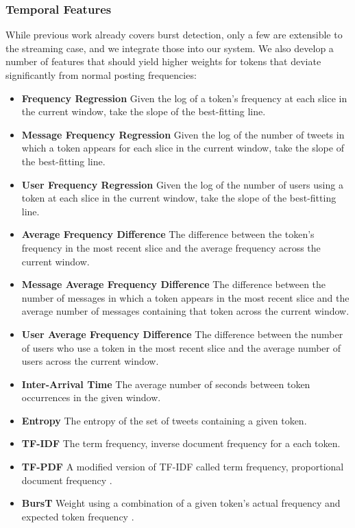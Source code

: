 \documentclass{sig-alternate}
\begin{document}
\subsubsection{Temporal Features}

While previous work already covers burst detection, only a few are extensible to the streaming case, and we integrate those into our system.
We also develop a number of features that should yield higher weights for tokens that deviate significantly from normal posting frequencies:

\begin{itemize}
\item \textbf{Frequency Regression} Given the log of a token's frequency at each slice in the current window, take the slope of the best-fitting line.
\item \textbf{Message Frequency Regression} Given the log of the number of tweets in which a token appears for each slice in the current window, take the slope of the best-fitting line.
\item \textbf{User Frequency Regression} Given the log of the number of users using a token at each slice in the current window, take the slope of the best-fitting line.
\item \textbf{Average Frequency Difference} The difference between the token's frequency in the most recent slice and the average frequency across the current window.
\item \textbf{Message Average Frequency Difference} The difference between the number of messages in which a token appears in the most recent slice and the average number of messages containing that token across the current window.
\item \textbf{User Average Frequency Difference} The difference between the number of users who use a token in the most recent slice and the average number of users across the current window.
\item \textbf{Inter-Arrival Time} The average number of seconds between token occurrences in the given window.
\item \textbf{Entropy} The entropy of the set of tweets containing a given token.
\item \textbf{TF-IDF} The term frequency, inverse document frequency for a each token.
\item \textbf{TF-PDF} A modified version of TF-IDF called term frequency, proportional document frequency \cite{Bun:2002:TEN:645962.674082}.
\item \textbf{BursT} Weight using a combination of a given token's actual frequency and expected token frequency \cite{Lee:2011:BDT:2009463.2009531}.
\end{itemize}
\end{document}

